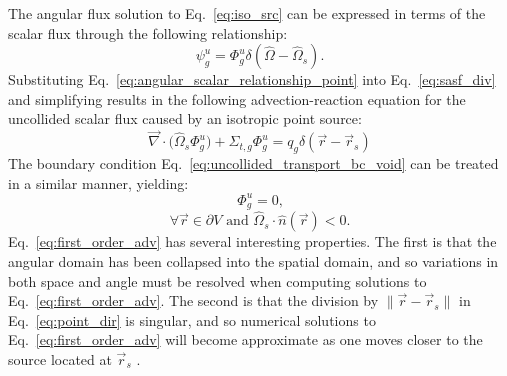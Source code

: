 The angular flux solution to Eq.~\ref{eq:iso_src} can be expressed in terms of the scalar flux through the following relationship:
\begin{equation}\label{eq:angular_scalar_relationship_point}
    \psi^{u}_{g} = \Phi^{u}_{g}\delta(\hat{\Omega} - \hat{\Omega}_{s})\text{.}
\end{equation}
Substituting Eq.~\ref{eq:angular_scalar_relationship_point} into Eq.~\ref{eq:sasf_div} and simplifying results in the following advection-reaction equation for the uncollided scalar flux caused by an isotropic point source:
\begin{equation}\label{eq:first_order_adv}
    \vec{\nabla}\cdot\Big(\hat{\Omega}_{s}\Phi^{u}_{g}\Big) + \Sigma_{t,g}\Phi^{u}_{g} = q_{g}\delta(\vec{r} - \vec{r}_{s})
\end{equation}
The boundary condition Eq.~\ref{eq:uncollided_transport_bc_void} can be treated in a similar manner, yielding:
\begin{equation}\label{eq:first_order_adv_bc}
    \Phi^{u}_{g} = 0\text{,}
\end{equation}
\begin{equation*}
    \forall \vec{r}\in\partial V \text{ and } \hat{\Omega}_{s}\cdot\hat{n}(\vec{r}) < 0\text{.}
\end{equation*}
Eq.~\ref{eq:first_order_adv} has several interesting properties. The first is that the angular domain has been collapsed into the spatial domain, and so variations in both space and angle must be resolved when computing solutions to Eq.~\ref{eq:first_order_adv}. The second is that the division by $\|\vec{r} - \vec{r}_{s}\|$ in Eq.~\ref{eq:point_dir} is singular, and so numerical solutions to Eq.~\ref{eq:first_order_adv} will become approximate as one moves closer to the source located at $\vec{r}_{s}$ \cite{modified_sn}.

